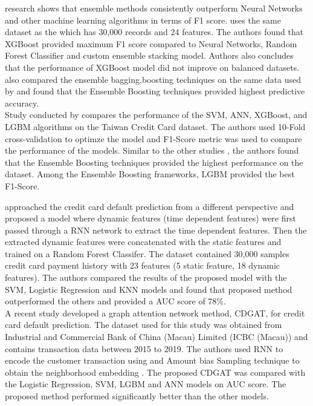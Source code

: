 \documentclass[twoside,11pt,a4paper]{article}
\begin{document}
\citep{faraj2021comparison} research shows that ensemble  methods  consistently  outperform  Neural  Networks  and  other  machine  learning algorithms in terms of F1 score. \citep{faraj2021comparison} uses the same dataset as the \citep{sayjadah2018credit} which has 30,000 records and 24 features. The authors found that \acs{XGBoost} provided maximum F1 score compared to Neural Networks, Random Forest Classifier and custom ensemble stacking model. Authors also concludes that the performance of \acs{XGBoost} model did not improve on balanced datasets. \citep{emil2019enhancing} also compared the ensemble bagging,boosting techniques on the same data used by \citep{faraj2021comparison} and found that 
the Ensemble Boosting techniques provided highest predictive accuracy.  \\

Study conducted by \cite{yang2018comparison} compares the performance of the \acs{SVM}, \acs{ANN}, \acs{XGBoost}, and \acs{LGBM} algorithms on the Taiwan Credit Card dataset. The authors used 10-Fold cross-validation to optimze the model and  F1-Score metric was used to compare the performance of the models. Similar to the other studies \citep{faraj2021comparison} \citep{emil2019enhancing}, the authors found that the Ensemble Boosting techniques provided the highest performance on the dataset. Among the Ensemble Boosting frameworks, \acs{LGBM} provided the best F1-Score.

\citep{hsu2019enhanced} approached the credit card default prediction from a different perspective and proposed a model where dynamic features (time dependent features) were first passed through a \acf{RNN} network to extract the time dependent features. Then the extracted dynamic features were concatenated with the static features and trained on a Random Forest Classifer. The dataset contained 30,000 samples credit card payment history with 23 features (5 static feature, 18 dynamic features). The authors compared the results of the proposed model with the \acs{SVM}, Logistic Regression and KNN models and found that proposed method outperformed the others and provided a \acs{AUC} score of 78\%.\\


A recent study \citep{wu2022cdgat} developed a graph attention network method, CDGAT, for credit card default prediction. The dataset used for this study was obtained from  Industrial and Commercial Bank of China (Macau) Limited (ICBC (Macau)) and contains transaction data between 2015 to 2019. The authors used \acs{RNN} to encode the customer transaction using and Amount bias Sampling technique to obtain the neighborhood embedding . The proposed CDGAT was compared with the Logistic Regression, \acs{SVM}, \acs{LGBM} and \acs{ANN}  models on \acs{AUC} score. The proposed method performed significantly better than the other models.\\
\end{document}
